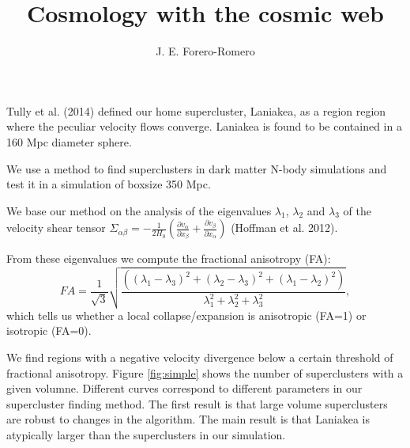 \documentclass[preprint,proceedings]{rmaa}
\title{Cosmology with the cosmic web}
\author{J. E. Forero-Romero\altaffilmark{1}}
\begin{document}
\maketitle 




Tully et al. (2014) defined our home supercluster, Laniakea, as a region
region where the peculiar velocity flows converge. Laniakea is found
to be contained in a 160 Mpc diameter sphere.

We use a method to find superclusters in dark matter N-body
simulations and test it in a simulation of boxsize 350 Mpc. 

We base our method on the analysis of the eigenvalues $\lambda_1$,
$\lambda_2$ and  $\lambda_3$ of the velocity shear tensor $\Sigma _{\alpha\beta} = -\frac{1}{2 H_0} \left( \frac{\partial v_{\alpha}}{\partial
  x_{\beta}} + \frac{\partial v_{\beta}}{\partial x_{\alpha}}
\right)$ (Hoffman et al. 2012).

From these eigenvalues we compute the fractional anisotropy
(FA):
\begin{equation}
  \label{eq:njump}
   FA = \frac{1}{\sqrt{3}} \sqrt{\frac{( \left( \lambda_1 - \lambda_3 \right)^2 +
   \left( \lambda_2 - \lambda_3 \right)^2 + \left( \lambda_1 - \lambda_2 \right)^2 
   )}{\lambda^{2}_1 + \lambda^{2}_2 + \lambda^{2}_3}},
\end{equation}
which tells us whether a local collapse/expansion is anisotropic (FA=1) or
isotropic (FA=0).

We find regions with a negative velocity divergence below a
certain threshold of fractional anisotropy.
Figure
\ref{fig:simple} shows the number of superclusters with a given volumne.
Different curves correspond to different parameters in our
supercluster finding method. The first result is that large volume
superclusters are robust to changes in the algorithm.
The main result is that Laniakea is atypically larger than the
superclusters in our simulation. 
\end{document}
